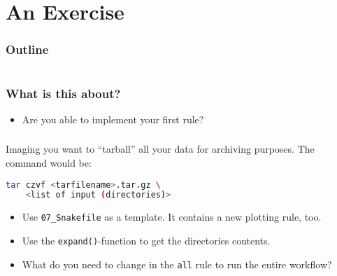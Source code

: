 \section{An Exercise}

\begin{frame}
    \frametitle{Outline}
    \begin{columns}[t]
        \begin{column}{.5\textwidth}
            \tableofcontents[sections={1-9},currentsection]
        \end{column}
        \begin{column}{.5\textwidth}
            \tableofcontents[sections={10-18},currentsection]
        \end{column}
    \end{columns}
\end{frame}

\begin{frame}
  \frametitle{What is this about?}
   \begin{question}[Questions]
   	  \begin{itemize}
         \item Are you able to implement your first rule?
      \end{itemize}
   \end{question}
\end{frame}  

\begin{frame}[fragile]
  \frametitle{}
  Imaging you want to ``tarball'' all your data for archiving purposes. The command would be:
  \begin{lstlisting}[language=Bash, style=Shell]
tar czvf <tarfilename>.tar.gz \
    <list of input (directories)>
  \end{lstlisting}
  \pause
  \begin{hint}[Hints]
  	 \begin{itemize}
       \item Use \texttt{07\_Snakefile} as a template. It contains a new plotting rule, too.
       \item Use the \texttt{expand()}-function to get the directories contents.
       \item What do you need to change in the \texttt{all} rule to run the entire workflow?
     \end{itemize}
   \end{hint}
\end{frame}
